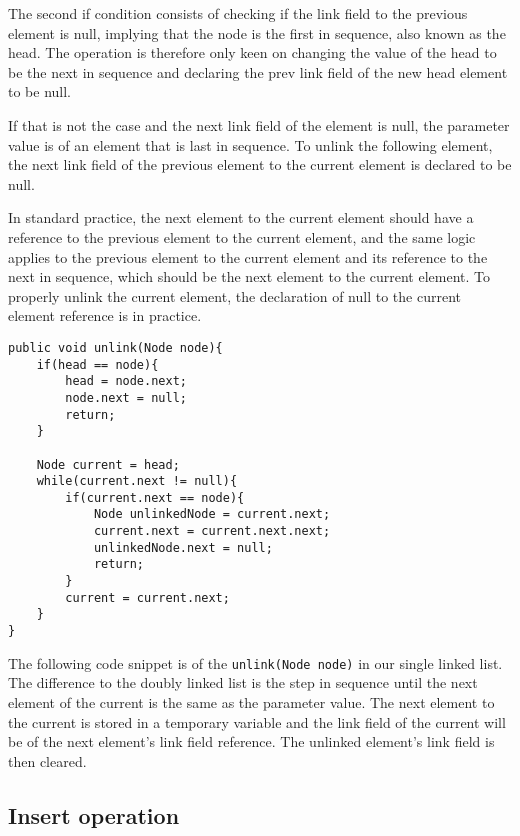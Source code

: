 \documentclass[a4paper,11pt]{article}
\begin{document}
        The second if condition consists of checking if the link field to the previous element is null, implying that the node is the first in sequence, also known as the head. The operation is therefore only keen on changing the value of the head to be the next in sequence and declaring the prev link field of the new head element to be null. 
        
        If that is not the case and the next link field of the element is null, the parameter value is of an element that is last in sequence. To unlink the following element, the next link field of the previous element to the current element is declared to be null.

        In standard practice, the next element to the current element should have a reference to the previous element to the current element, and the same logic applies to the previous element to the current element and its reference to the next in sequence, which should be the next element to the current element. To properly unlink the current element, the declaration of null to the current element reference is in practice.
\begin{verbatim}
public void unlink(Node node){
    if(head == node){
        head = node.next;
        node.next = null;
        return;
    }
    
    Node current = head;
    while(current.next != null){
        if(current.next == node){
            Node unlinkedNode = current.next;
            current.next = current.next.next;
            unlinkedNode.next = null;
            return;
        }
        current = current.next; 
    }
}
\end{verbatim}
        The following code snippet is of the \texttt{unlink(Node node)} in our single linked list. The difference to the doubly linked list is the step in sequence until the next element of the current is the same as the parameter value. The next element to the current is stored in a temporary variable and the link field of the current will be of the next element's link field reference. The unlinked element's link field is then cleared. 
    
    \subsection*{Insert operation}
\end{document}
